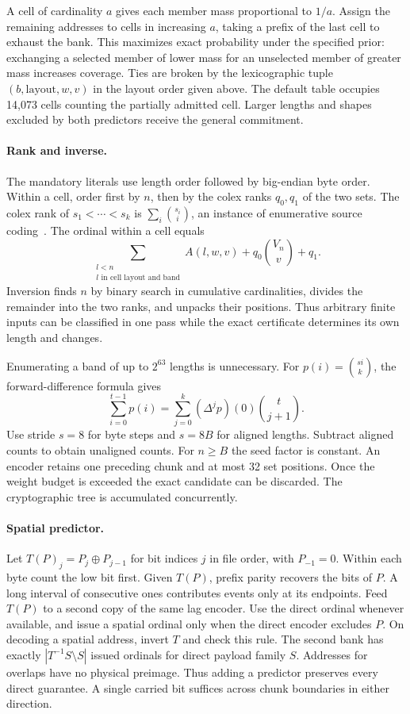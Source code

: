 \documentclass[10pt,twocolumn,letterpaper]{article}
\newcommand{\xor}{\mathbin\oplus}
\begin{document}
A cell of cardinality \(a\) gives each member mass proportional to \(1/a\). Assign the remaining addresses to cells in increasing \(a\), taking a prefix of the last cell to exhaust the bank. This maximizes exact probability under the specified prior: exchanging a selected member of lower mass for an unselected member of greater mass increases coverage. Ties are broken by the lexicographic tuple \((b,\mathrm{layout},w,v)\) in the layout order given above. The default table occupies 14,073 cells counting the partially admitted cell. Larger lengths and shapes excluded by both predictors receive the general commitment.

\paragraph{Rank and inverse.}
The mandatory literals use length order followed by big-endian byte order. Within a cell, order first by \(n\), then by the colex ranks \(q_0,q_1\) of the two sets. The colex rank of \(s_1<\cdots<s_k\) is \(\sum_i\binom{s_i}{i}\), an instance of enumerative source coding~\cite{cover}. The ordinal within a cell equals
\[
 \sum_{\substack{l<n\\ l\text{ in cell layout and band}}} A(l,w,v)
      +q_0\binom{V_n}{v}+q_1 .
\]
Inversion finds \(n\) by binary search in cumulative cardinalities, divides the remainder into the two ranks, and unpacks their positions. Thus arbitrary finite inputs can be classified in one pass while the exact certificate determines its own length and changes.

Enumerating a band of up to \(2^{63}\) lengths is unnecessary. For \(p(i)=\binom{si}{k}\), the forward-difference formula gives
\[
 \sum_{i=0}^{t-1}p(i)
     =\sum_{j=0}^{k}(\Delta^j p)(0)\binom{t}{j+1}.
\]
Use stride \(s=8\) for byte steps and \(s=8B\) for aligned lengths. Subtract aligned counts to obtain unaligned counts. For \(n\ge B\) the seed factor is constant. An encoder retains one preceding chunk and at most 32 set positions. Once the weight budget is exceeded the exact candidate can be discarded. The cryptographic tree is accumulated concurrently.

\paragraph{Spatial predictor.}
Let \(T(P)_j=P_j\xor P_{j-1}\) for bit indices \(j\) in file order, with \(P_{-1}=0\). Within each byte count the low bit first. Given \(T(P)\), prefix parity recovers the bits of \(P\). A long interval of consecutive ones contributes events only at its endpoints. Feed \(T(P)\) to a second copy of the same lag encoder. Use the direct ordinal whenever available, and issue a spatial ordinal only when the direct encoder excludes \(P\). On decoding a spatial address, invert \(T\) and check this rule. The second bank has exactly \(|T^{-1}S\setminus S|\) issued ordinals for direct payload family \(S\). Addresses for overlaps have no physical preimage. Thus adding a predictor preserves every direct guarantee. A single carried bit suffices across chunk boundaries in either direction.
\end{document}
